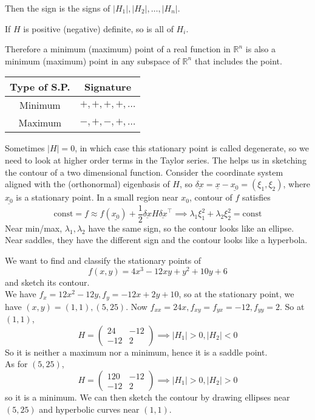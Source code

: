 Then the sign is the signs of $|H_1|,|H_2|,\ldots,|H_n|$.
\begin{theorem}
    If $H$ is positive (negative) definite, so is all of $H_i$.
\end{theorem}
Therefore a minimum (maximum) point of a real function in $\mathbb R^n$ is also a minimum (maximum) point in any subspace of $\mathbb R^n$ that includes the point.
\begin{center}
    \begin{tabular}{c|c}
        Type of S.P.&Signature\\
        \hline
        Minimum&$+,+,+,+,\ldots$\\
        Maximum&$-,+,-,+,\ldots$
    \end{tabular}
\end{center}
Sometimes $|H|=0$, in which case this stationary point is called degenerate, so we need to look at higher order terms in the Taylor series.
The helps us in sketching the contour of a two dimensional function.
Consider the coordinate system aligned with the (orthonormal) eigenbasis of $H$, so $\underline{\delta x}=\underline{x}-\underline{x_0}=(\xi_1,\xi_2)$, where $\underline{x_0}$ is a stationary point.
In a small region near $x_0$, contour of $f$ satisfies
$$\text{const}=f\approx f(\underline{x_0})+\frac{1}{2}\underline{\delta x}H\underline{\delta x}^\top\implies \lambda_1\xi_1^2+\lambda_2\xi_2^2=\text{const}$$
Near min/max, $\lambda_1,\lambda_2$ have the same sign, so the contour looks like an ellipse.
Near saddles, they have the different sign and the contour looks like a hyperbola.
\begin{example}
    We want to find and classify the stationary points of
    $$f(x,y)=4x^3-12xy+y^2+10y+6$$
    and sketch its contour.\\
    We have $f_x=12x^2-12y,f_y=-12x+2y+10$, so at the stationary point, we have $(x,y)=(1,1),(5,25)$.
    Now $f_{xx}=24x,f_{xy}=f_{yx}=-12,f_{yy}=2$.
    So at $(1,1)$,
    $$H=\begin{pmatrix}
        24&-12\\
        -12&2
    \end{pmatrix}\implies |H_1|>0,|H_2|<0$$
    So it is neither a maximum nor a minimum, hence it is a saddle point.\\
    As for $(5,25)$,
    $$H=\begin{pmatrix}
        120&-12\\
        -12&2
    \end{pmatrix}\implies |H_1|>0,|H_2|>0$$
    so it is a minimum.
    We can then sketch the contour by drawing ellipses near $(5,25)$ and hyperbolic curves near $(1,1)$.
\end{example}
